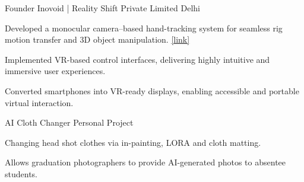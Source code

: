 

\begin{cventries}

  \cventry
    {Founder} %
    {Inovoid | Reality Shift Private Limited} %
    {Delhi} %
    {} %
    {
      \begin{cvitems} %
        \item {Developed a monocular camera--based hand-tracking system for seamless rig motion transfer and 3D object manipulation. \href{https://tracxn.com/d/legal-entities/india/reality-shift-private-limited/__p84iShuRwVjNrh9BXbQ9u9Hqh1QbA7y_OxL-IBy0YMk\#about}{[link]}}
        \item {Implemented VR-based control interfaces, delivering highly intuitive and immersive user experiences.}
        \item {Converted smartphones into VR-ready displays, enabling accessible and portable virtual interaction.}
      \end{cvitems}
    }

  \cventry
    {AI Cloth Changer} %
    {Personal Project} %
    {} %
    {} %
    {
      \begin{cvitems} %
        \item {Changing head shot clothes via in-painting, LORA and cloth matting.}
        \item {Allows graduation photographers to provide AI-generated photos to absentee students.}
      \end{cvitems}
    }

\end{cventries}
